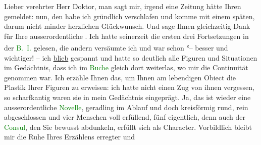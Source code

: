\pstart
           Lieber verehrter Herr Doktor, man sagt mir, irgend eine Zeitung
               hätte Ihren \label{K_L03674-1v}\label{K_L03674-1h} gemeldet: nun, den habe ich gründlich
               verschlafen und komme mit einem späten, darum nicht minder herzlichen Glückwunsch.
               Und sage Ihnen gleichzeitig Dank für Ihre ausserordentliche \label{K_L03674-2v}\label{K_L03674-2h}. Ich hatte seinerzeit die ersten drei Fortsetzungen in der \textcolor{green}{B. I.}{}\ledrightnote{\textcolor{green}{Berliner Illustrirte Zeitung}} gelesen, die andern versäumte ich und war
               schon \substVorne{}\textsuperscript{z}\substDazwischen{}–\substHinten{} besser und wichtiger! – ich \uline{blieb} gespannt
               und hatte so deutlich alle Figuren und Situationen im Gedächtnis, dass ich im \textcolor{green}{Buche}{}\ledrightnote{{$\rightarrow$}\textcolor{green}{Spiel im Morgengrauen. Novelle}} gleich dort weiterlas, wo
               mir die Continuität genommen war. Ich erzähle Ihnen das, um Ihnen am lebendigen
               Obiect die Plastik Ihrer Figuren zu erweisen: ich hatte nicht einen Zug von ihnen
               vergessen, so scharfkantig waren sie in mein Gedächtnis eingeprägt. Ja, das ist
               wieder eine ausserordentliche \textcolor{green}{Novelle}{}\ledrightnote{{$\rightarrow$}\textcolor{green}{Spiel im Morgengrauen. Novelle}}, geradling im Ablauf und doch kreisförmig rund, rein abgeschlossen
               und vier Menschen voll erfüllend, fünf eigentlich, denn auch der \textcolor{green}{Consul}{}\ledrightnote{{$\rightarrow$}\textcolor{green}{Spiel im Morgengrauen. Novelle}}, den Sie bewusst abdunkeln, erfüllt
               sich als Character. Vorbildlich bleibt mir die Ruhe Ihres Erzählens erregter und
